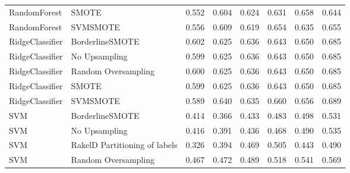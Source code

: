 \begin{tabular}{llllllll}
                   RandomForest &                         SMOTE & 0.552 &                     0.604 &                 0.624 &                  0.631 &                                   0.658 &     0.644 \\
                   RandomForest &                      SVMSMOTE & 0.556 &                     0.609 &                 0.619 &                  0.654 &                                   0.635 &     0.655 \\
                RidgeClassifier &               BorderlineSMOTE & 0.602 &                     0.625 &                 0.636 &                  0.643 &                                   0.650 &     0.685 \\
                RidgeClassifier &                 No Upsampling & 0.599 &                     0.625 &                 0.636 &                  0.643 &                                   0.650 &     0.685 \\
                RidgeClassifier &           Random Oversampling & 0.600 &                     0.625 &                 0.636 &                  0.643 &                                   0.650 &     0.685 \\
                RidgeClassifier &                         SMOTE & 0.599 &                     0.625 &                 0.636 &                  0.643 &                                   0.650 &     0.685 \\
                RidgeClassifier &                      SVMSMOTE & 0.589 &                     0.640 &                 0.635 &                  0.660 &                                   0.656 &     0.689 \\
                            SVM &               BorderlineSMOTE & 0.414 &                     0.366 &                 0.433 &                  0.483 &                                   0.498 &     0.531 \\
                            SVM &                 No Upsampling & 0.416 &                     0.391 &                 0.436 &                  0.468 &                                   0.490 &     0.535 \\
                            SVM & RakelD Partitioning of labels & 0.326 &                     0.394 &                 0.469 &                  0.505 &                                   0.443 &     0.490 \\
                            SVM &           Random Oversampling & 0.467 &                     0.472 &                 0.489 &                  0.518 &                                   0.541 &     0.569 \\

\end{tabular}

